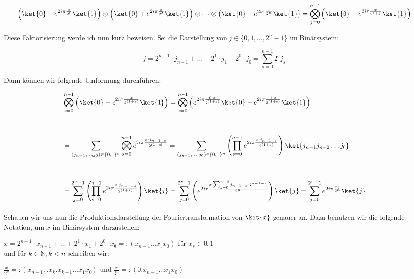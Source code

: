 \begin{align*}
    \left(\ket{0} + e^{2i\pi\frac{x}{2^{1}}}\ket{1}\right)\otimes\left(\ket{0} + e^{2i\pi\frac{x}{2^{2}}}\ket{1}\right)\otimes\cdots\otimes\left(\ket{0} + e^{2i\pi\frac{x}{2^{n}}}\ket{1}\right) = \bigotimes_{j = 0}^{n - 1}\left(\ket{0} + e^{2i\pi\frac{x}{2^{1 + j}}}\ket{1}\right)
\end{align*}

Diese Faktorisierung werde ich nun kurz beweisen. Sei die Darstellung von $j \in \{0, 1, \dots, 2^n - 1\}$ im Binärsystem:

$$j=2^{n-1}\cdot j_{n-1}+\ldots + 2^1\cdot j_1+2^0\cdot j_0 = \sum_{s = 0}^{n - 1}2^sj_s$$

Dann können wir folgende Umformung durchführen:

\begin{align*}
&\bigotimes_{s = 0}^{n - 1}{\left( \ket{0} + e^{2i\pi\frac{x}{2^{(1 + s)}}}\ket{1} \right)} = \bigotimes_{s = 0}^{n - 1}{\left( e^{2i\pi\frac{0\cdot x}{2^{(1 + s)}}}\ket{0} + e^{2i\pi\frac{1 \cdot x}{2^{(1 + s)}}}\ket{1} \right)} \\[1cm] &= \sum_{(j_{n-1},\dots,j_0)\in \{0, 1\}^n}\bigotimes_{s = 0}^{n - 1}e^{2i\pi\frac{x\cdot j_{n - 1 - s}}{2^{(1 + s)}}} = \sum_{(j_{n-1},\dots,j_0)\in \{0, 1\}^n}\left( \prod_{s = 0}^{n - 1}e^{2i\pi\frac{x\cdot j_{n - 1 - s}}{2^{(1 + s)}}} \right)\ket{j_{n - 1}j_{n - 2}\dots j_0} \\[1cm] &= \sum_{j = 0}^{2^n - 1} \left( \prod_{s = 0}^{n - 1}e^{2i\pi\frac{x\cdot j_{n - 1 - s}}{2^{(1 + s)}}} \right) \ket{j} = \sum_{j = 0}^{2^n - 1}\left( e^{2i\pi\frac{x\sum_{s = 0}^{n - 2}{j_{n - 1 - s}\cdot 2^{n - 1 - s}}}{2^n}} \right)\ket{j} = \sum_{j = 0}^{2^n - 1}e^{2i\pi\frac{xj}{2^n}}\ket{j}
\end{align*}
\paragraph{}

\noindent Schauen wir uns nun die Produktionsdarstellung der Fouriertransformation von $\ket{x}$ genauer an. Dazu benutzen wir die folgende Notation, um $x$ im Binärsystem darzustellen:

$x = 2^{n - 1}\cdot x_{n - 1} + \dots + 2^1 \cdot x_1 + 2^0 \cdot x_0 =: (x_{n - 1}\dots x_1x_0)$ \quad für $x_s \in {0, 1}$ \\
und für $k \in \mathbb{N}, k < n$ schreiben wir:

$\frac{x}{2^k} =: (x_{n - 1}\dots x_k.x_{k - 1}\dots x_1x_0)$ \quad und \quad $\frac{x}{2^n} =: (0.x_{n - 1}\dots x_1x_0)$

